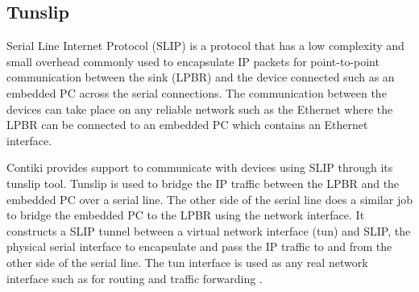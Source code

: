 
\subsection{Tunslip}
Serial Line Internet Protocol (SLIP) \cite{slip} is a protocol that has a low complexity and small overhead commonly used to encapsulate IP packets for point-to-point communication between the sink (LPBR) and the device connected such as an embedded PC across the serial connections. The communication between the devices can take place on any reliable network such as the Ethernet where the LPBR can be connected to an embedded PC which contains an Ethernet interface.


Contiki provides support to communicate with devices using SLIP through its tunslip tool. Tunslip is used to bridge the IP traffic between the LPBR and the embedded PC over a serial line. The other side of the serial line does a similar job to bridge the embedded PC to the LPBR using the network interface. It constructs a SLIP tunnel between a virtual network interface (tun) and SLIP, the physical serial interface to encapsulate and pass the IP traffic to and from the other side of the serial line. The tun interface is used as any real network interface such as for routing and traffic forwarding \cite{tunslip, multipleSinks}.


